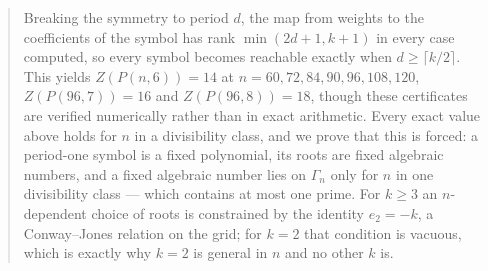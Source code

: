 \documentclass[11pt]{article}
\theoremstyle{definition}
\begin{document}
\begin{abstract}
Breaking the symmetry to period $d$, the map from weights to the coefficients of
the symbol has rank $\min(2d+1,k+1)$ in every case computed, so every symbol
becomes reachable exactly when $d\ge\lceil k/2\rceil$. This yields
$Z(P(n,6))=14$ at $n=60,72,84,90,96,108,120$, $Z(P(96,7))=16$ and
$Z(P(96,8))=18$, though these certificates are verified numerically rather than
in exact arithmetic. Every exact value above holds for $n$ in a divisibility class, and we prove that
this is forced: a period-one symbol is a fixed polynomial, its roots are fixed
algebraic numbers, and a fixed algebraic number lies on $\Gamma_n$ only for $n$
in one divisibility class --- which contains at most one prime. For $k\ge3$ an
$n$-dependent choice of roots is constrained by the identity $e_2=-k$, a
Conway--Jones relation on the grid; for $k=2$ that condition is vacuous, which is
exactly why $k=2$ is general in $n$ and no other $k$ is.


\end{abstract}
\end{document}
